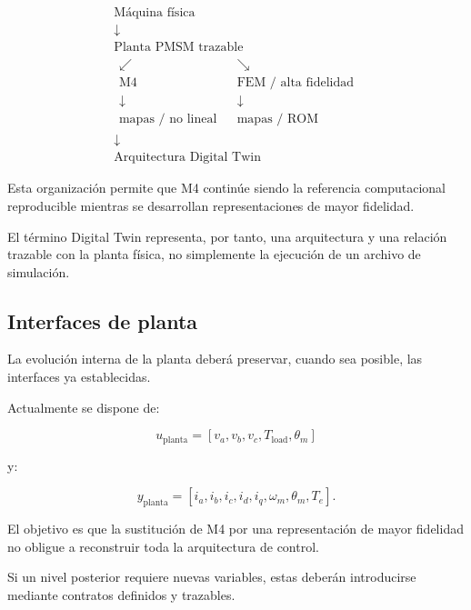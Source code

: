 \begin{equation}
\boxed{
\begin{array}{c}
\text{Máquina física}
\\[2mm]
\downarrow
\\
\text{Planta PMSM trazable}
\\[2mm]
\begin{array}{ccc}
\swarrow & & \searrow \\
\text{M4} & & \text{FEM / alta fidelidad} \\
\downarrow & & \downarrow \\
\text{mapas / no lineal} & & \text{mapas / ROM}
\end{array}
\\[2mm]
\downarrow
\\
\text{Arquitectura Digital Twin}
\end{array}
}
\end{equation}

Esta organización permite que M4 continúe siendo la referencia computacional reproducible mientras se desarrollan representaciones de mayor fidelidad.

El término Digital Twin representa, por tanto, una arquitectura y una relación trazable con la planta física, no simplemente la ejecución de un archivo de simulación.

\subsection{Interfaces de planta}

La evolución interna de la planta deberá preservar, cuando sea posible, las interfaces ya establecidas.

Actualmente se dispone de:

\begin{equation}
u_{\mathrm{planta}}
=
[v_a,v_b,v_c,T_{\mathrm{load}},\theta_m]
\end{equation}

y:

\begin{equation}
y_{\mathrm{planta}}
=
[i_a,i_b,i_c,i_d,i_q,\omega_m,\theta_m,T_e].
\end{equation}

El objetivo es que la sustitución de M4 por una representación de mayor fidelidad no obligue a reconstruir toda la arquitectura de control.

Si un nivel posterior requiere nuevas variables, estas deberán introducirse mediante contratos definidos y trazables.

